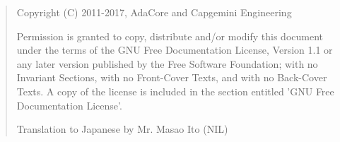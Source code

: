 \bigskip
\begin{quote}
   Copyright (C) 2011-2017, AdaCore and Capgemini Engineering

   Permission is granted to copy, distribute and/or modify this document
   under the terms of the GNU Free Documentation License, Version 1.1
   or any later version published by the Free Software Foundation;
   with no Invariant Sections, with no Front-Cover Texts, and with no
   Back-Cover Texts.
   A copy of the license is included in the section entitled 'GNU
   Free Documentation License'.

   Translation to Japanese by Mr. Masao Ito (NIL)
\end{quote}
\bigskip
